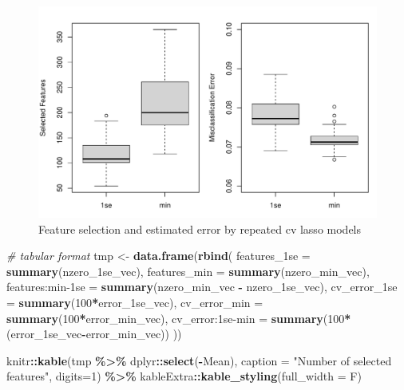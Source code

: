 \documentclass[
]{book}
\newenvironment{Shaded}{\begin{snugshade}}{\end{snugshade}}
\newcommand{\CommentTok}[1]{\textcolor[rgb]{0.56,0.35,0.01}{\textit{#1}}}
\newcommand{\DataTypeTok}[1]{\textcolor[rgb]{0.13,0.29,0.53}{#1}}
\newcommand{\DecValTok}[1]{\textcolor[rgb]{0.00,0.00,0.81}{#1}}
\newcommand{\KeywordTok}[1]{\textcolor[rgb]{0.13,0.29,0.53}{\textbf{#1}}}
\newcommand{\NormalTok}[1]{#1}
\newcommand{\OperatorTok}[1]{\textcolor[rgb]{0.81,0.36,0.00}{\textbf{#1}}}
\newcommand{\StringTok}[1]{\textcolor[rgb]{0.31,0.60,0.02}{#1}}
\begin{document}
\begin{figure}
\centering
\includegraphics{Static/figures/hcc5hmC-glmnetSuite-model-size-lassoAll-1.pdf}
\caption{\label{fig:hcc5hmC-glmnetSuite-model-size-lassoAll}Feature selection and estimated error by repeated cv lasso models}
\end{figure}

\begin{Shaded}
\begin{Highlighting}[]
\CommentTok{\# tabular format}
\NormalTok{tmp <{-}}\StringTok{ }\KeywordTok{data.frame}\NormalTok{(}\KeywordTok{rbind}\NormalTok{(}
 \StringTok{\textasciigrave{}}\DataTypeTok{features\_1se}\StringTok{\textasciigrave{}}\NormalTok{ =}\StringTok{ }\KeywordTok{summary}\NormalTok{(nzero\_1se\_vec),}
 \DataTypeTok{features\_min =} \KeywordTok{summary}\NormalTok{(nzero\_min\_vec),}
 \StringTok{\textasciigrave{}}\DataTypeTok{features:min{-}1se}\StringTok{\textasciigrave{}}\NormalTok{ =}\StringTok{ }\KeywordTok{summary}\NormalTok{(nzero\_min\_vec }\OperatorTok{{-}}\StringTok{ }\NormalTok{nzero\_1se\_vec),}
 \StringTok{\textasciigrave{}}\DataTypeTok{cv\_error\_1se}\StringTok{\textasciigrave{}}\NormalTok{ =}\StringTok{ }\KeywordTok{summary}\NormalTok{(}\DecValTok{100}\OperatorTok{*}\NormalTok{error\_1se\_vec),}
 \DataTypeTok{cv\_error\_min =} \KeywordTok{summary}\NormalTok{(}\DecValTok{100}\OperatorTok{*}\NormalTok{error\_min\_vec),}
 \StringTok{\textasciigrave{}}\DataTypeTok{cv\_error:1se{-}min}\StringTok{\textasciigrave{}}\NormalTok{ =}\StringTok{ }\KeywordTok{summary}\NormalTok{(}\DecValTok{100}\OperatorTok{*}\NormalTok{(error\_1se\_vec}\OperatorTok{{-}}\NormalTok{error\_min\_vec))}
\NormalTok{))}

\NormalTok{knitr}\OperatorTok{::}\KeywordTok{kable}\NormalTok{(tmp }\OperatorTok{\%>\%}\StringTok{ }\NormalTok{dplyr}\OperatorTok{::}\KeywordTok{select}\NormalTok{(}\OperatorTok{{-}}\NormalTok{Mean),}
  \DataTypeTok{caption =} \StringTok{"Number of selected features"}\NormalTok{,}
  \DataTypeTok{digits=}\DecValTok{1}\NormalTok{) }\OperatorTok{\%>\%}
\StringTok{   }\NormalTok{kableExtra}\OperatorTok{::}\KeywordTok{kable\_styling}\NormalTok{(}\DataTypeTok{full\_width =}\NormalTok{ F)}
\end{Highlighting}
\end{Shaded}
\end{document}
